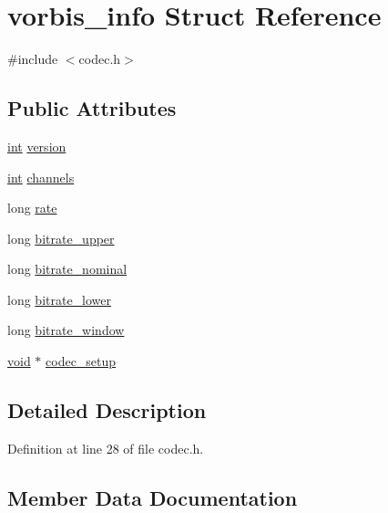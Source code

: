 \hypertarget{structvorbis__info}{}\section{vorbis\+\_\+info Struct Reference}
\label{structvorbis__info}


{\ttfamily \#include $<$codec.\+h$>$}

\subsection*{Public Attributes}
\begin{DoxyCompactItemize}
\item 
\hyperlink{xmltok_8h_a5a0d4a5641ce434f1d23533f2b2e6653}{int} \hyperlink{structvorbis__info_a2d832259b1e3fbf4d1cd619ab5743612}{version}
\item 
\hyperlink{xmltok_8h_a5a0d4a5641ce434f1d23533f2b2e6653}{int} \hyperlink{structvorbis__info_a4240e042b91744b4fd810426f18252b4}{channels}
\item 
long \hyperlink{structvorbis__info_a01879ed23ecd9605cf6779ef2663a681}{rate}
\item 
long \hyperlink{structvorbis__info_a2d9d0e0725ae71c855ad39ce07bf7c88}{bitrate\+\_\+upper}
\item 
long \hyperlink{structvorbis__info_a71127d3e35c30fa110d7f321302a91b8}{bitrate\+\_\+nominal}
\item 
long \hyperlink{structvorbis__info_a216284288febd46a5547901cd5e6cd62}{bitrate\+\_\+lower}
\item 
long \hyperlink{structvorbis__info_aa511ecfc9eee8129df8f70e62ed08dc7}{bitrate\+\_\+window}
\item 
\hyperlink{sound_8c_ae35f5844602719cf66324f4de2a658b3}{void} $\ast$ \hyperlink{structvorbis__info_a440988f081a417fd1586a4c3d44bc00c}{codec\+\_\+setup}
\end{DoxyCompactItemize}


\subsection{Detailed Description}


Definition at line 28 of file codec.\+h.



\subsection{Member Data Documentation}
